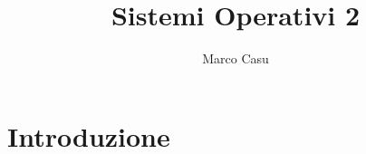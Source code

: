 \documentclass[12pt, letterpaper]{article}
\title{Sistemi Operativi 2}
\author{Marco Casu}
\date{\vspace{-5ex}}
\begin{document}
\maketitle
\begin{figure}[h]
\end{figure}
\newpage 
\tableofcontents
\newpage
\section{Introduzione}
\end{document}
